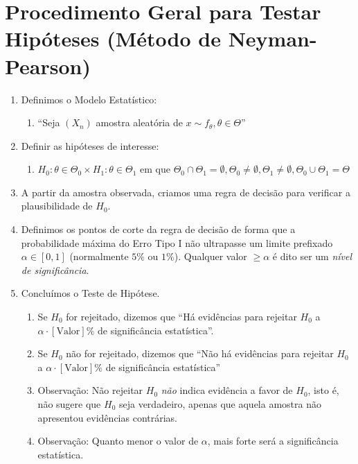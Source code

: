 \documentclass[
  letterpaper,
  DIV=11,
  numbers=noendperiod]{scrreprt}
\providecommand{\tightlist}{%
  \setlength{\itemsep}{0pt}\setlength{\parskip}{0pt}}\usepackage{longtable,booktabs,array}
\begin{document}

\chapter{Procedimento Geral para Testar Hipóteses (Método de
Neyman-Pearson)}\label{procedimento-geral-para-testar-hipuxf3teses-muxe9todo-de-neyman-pearson}

\begin{enumerate}
\def\labelenumi{\arabic{enumi}.}
\tightlist
\item
  Definimos o Modelo Estatístico:

  \begin{enumerate}
  \def\labelenumii{\arabic{enumii}.}
  \tightlist
  \item
    ``Seja \((X_{n})\) amostra aleatória de
    \(x \sim f_{\theta}, \theta \in \Theta\)''
  \end{enumerate}
\item
  Definir as hipóteses de interesse:

  \begin{enumerate}
  \def\labelenumii{\arabic{enumii}.}
  \tightlist
  \item
    \(H_{0}: \theta \in \Theta_{0} \times H_{1}: \theta \in \Theta_{1}\)
    em que
    \(\Theta_{0} \cap \Theta_{1} = \emptyset, \Theta_{0} \neq \emptyset, \Theta_{1}\neq \emptyset, \Theta_{0}\cup \Theta_{1}=\Theta\)
  \end{enumerate}
\item
  A partir da amostra observada, criamos uma regra de decisão para
  verificar a plausibilidade de \(H_{0}\).
\item
  Definimos os pontos de corte da regra de decisão de forma que a
  probabilidade máxima do Erro Tipo I não ultrapasse um limite prefixado
  \(\alpha \in [0,1]\) (normalmente \(5\%\) ou \(1\%\)). Qualquer valor
  \(\geq \alpha\) é dito ser um \emph{nível de significância}.
\item
  Concluímos o Teste de Hipótese.

  \begin{enumerate}
  \def\labelenumii{\arabic{enumii}.}
  \tightlist
  \item
    Se \(H_{0}\) for rejeitado, dizemos que ``Há evidências para
    rejeitar \(H_{0}\) a \(\alpha \cdot [\mathrm{Valor}]\%\) de
    significância estatística''.
  \item
    Se \(H_{0}\) não for rejeitado, dizemos que ``Não há evidências para
    rejeitar \(H_{0}\) a \(\alpha \cdot [\mathrm{Valor}]\%\) de
    significância estatística''
  \item
    Observação: Não rejeitar \(H_{0}\) \emph{não} indica evidência a
    favor de \(H_{0}\), isto é, não sugere que \(H_{0}\) seja
    verdadeiro, apenas que aquela amostra não apresentou evidências
    contrárias.
  \item
    Observação: Quanto menor o valor de \(\alpha\), mais forte será a
    significância estatística.
  \end{enumerate}
\end{enumerate}
\end{document}
